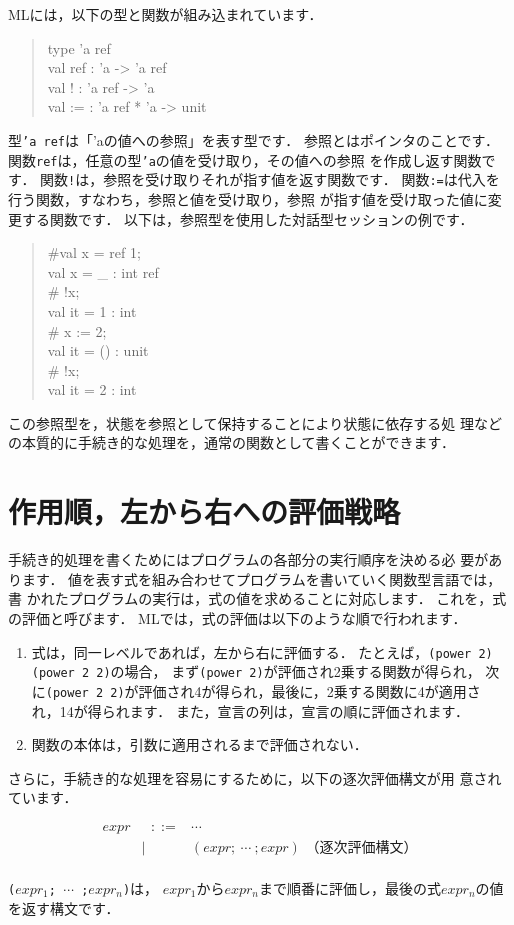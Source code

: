 \documentclass{jbook}
\begin{document}
	MLには，以下の型と関数が組み込まれています．
\begin{tt}
\begin{quote}
type 'a ref\\
val ref : 'a -> 'a ref\\
val ! : 'a ref -> 'a\\
val := : 'a ref * 'a -> unit
\end{quote}
\end{tt}
	型{\tt 'a ref}は「'aの値への参照」を表す型です．
	参照とはポインタのことです．
	関数{\tt ref}は，任意の型{\tt 'a}の値を受け取り，その値への参照
を作成し返す関数です．
	関数{\tt !}は，参照を受け取りそれが指す値を返す関数です．
	関数{\tt :=}は代入を行う関数，すなわち，参照と値を受け取り，参照
が指す値を受け取った値に変更する関数です．
	以下は，参照型を使用した対話型セッションの例です．
\begin{tt}
\begin{quote}
\#val x = ref 1;\\
val x = \_ : int ref\\
\# !x;\\
val it = 1 : int\\
\# x := 2;\\
val it = () : unit\\
\# !x;\\
val it = 2 : int
\end{quote}
\end{tt}
	この参照型を，状態を参照として保持することにより状態に依存する処
理などの本質的に手続き的な処理を，通常の関数として書くことができます．

\section{作用順，左から右への評価戦略}
\label{sec:tutorialSideeffect}

	手続き的処理を書くためにはプログラムの各部分の実行順序を決める必
要があります．
	値を表す式を組み合わせてプログラムを書いていく関数型言語では，書
かれたプログラムの実行は，式の値を求めることに対応します．
	これを，式の評価と呼びます．
	MLでは，式の評価は以下のような順で行われます．
\begin{enumerate}
\item 式は，同一レベルであれば，左から右に評価する．
	たとえば，{\tt (power 2) (power 2 2)}の場合，
まず{\tt (power 2)}が評価され2乗する関数が得られ，
次に{\tt (power 2 2)}が評価され4が得られ，最後に，2乗する関数に4が適用さ
れ，14が得られます．
	また，宣言の列は，宣言の順に評価されます．
\item 関数の本体は，引数に適用されるまで評価されない．
\end{enumerate}
	さらに，手続き的な処理を容易にするために，以下の逐次評価構文が用
意されています．
\begin{tt}
\begin{eqnarray*}
expr &\mbox{\ \ }::=& \cdots\\
     &|& (expr;{\ }\cdots{\ };expr)   \mbox{\ \ \ \ （逐次評価構文）} \\
\end{eqnarray*}
\end{tt}
{\tt ($expr_1$;{\ }$\cdots${\ };$expr_n$)}は，
$expr_1$から$expr_n$まで順番に評価し，最後の式$expr_n$の値を返す構文です．
\end{document}
